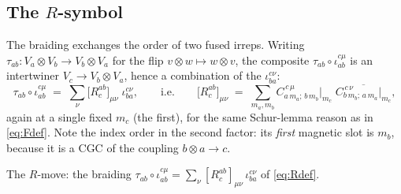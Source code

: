 \documentclass[11pt,a4paper]{article}
\theoremstyle{plain}
\theoremstyle{definition}
\newcommand{\fvert}[2]{\node[fvertex] at (#1) {};%
  \node[fleg, right=1pt] at (#1) {$#2$};}
\begin{document}
\subsection{The $R$-symbol}

The braiding exchanges the order of two fused irreps. Writing
$\tau_{ab}: V_a\otimes V_b \to V_b\otimes V_a$ for the flip $v\otimes w\mapsto
w\otimes v$, the composite $\tau_{ab}\circ\iota^{c\mu}_{ab}$ is an intertwiner
$V_c\to V_b\otimes V_a$, hence a combination of the $\iota^{c\nu}_{ba}$:
\begin{equation}\label{eq:Rdef}
  \tau_{ab}\circ \iota^{c\mu}_{ab}
  \;=\; \sum_{\nu} \bigl[R^{ab}_{c}\bigr]_{\mu\nu}\; \iota^{c\nu}_{ba},
  \qquad\text{i.e.}\qquad
  \bigl[R^{ab}_{c}\bigr]_{\mu\nu}
  \;=\; \sum_{m_a,m_b}
     C^{\,c\,\mu}_{a\,m_a;\,b\,m_b}\Big|_{m_c}\;
     \overline{C^{\,c\,\nu}_{b\,m_b;\,a\,m_a}\Big|_{m_c}} ,
\end{equation}
again at a single fixed $m_c$ (the first), for the same Schur-lemma reason as
in \eqref{eq:Fdef}. Note the index order in the second factor: its \emph{first}
magnetic slot is $m_b$, because it is a CGC of the coupling $b\otimes a\to c$.

\begin{center}

\smallskip
{\small The $R$-move: the braiding
$\tau_{ab}\circ\iota^{c\mu}_{ab}=\sum_\nu[R^{ab}_c]_{\mu\nu}\,\iota^{c\nu}_{ba}$
of \eqref{eq:Rdef}.}
\end{center}
\end{document}
